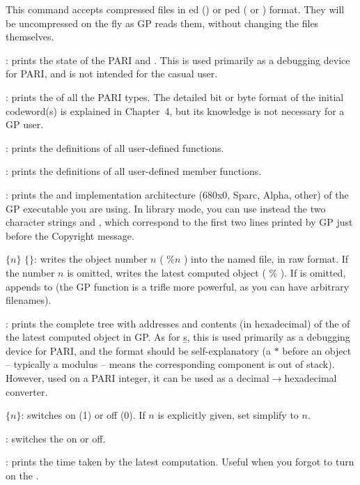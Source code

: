 \unix This command accepts compressed files in ed ()
or ped ( or ) format. They will be uncompressed on
the fly as GP reads them, without changing the files themselves.

: prints the state of the PARI  and .
This is used primarily as a debugging device for PARI, and is not intended
for the casual user.

: prints the  of all the PARI
types. The detailed bit or byte format of the initial codeword(s) is
explained in Chapter~4, but its knowledge is not necessary for a GP user.

: prints the definitions of all user-defined functions.

: prints the definitions of all user-defined member functions.

: prints the  and implementation architecture
(680x0, Sparc, Alpha, other) of the GP executable you are using. In library
mode, you can use instead the two character strings  and
, which correspond to the first two lines printed by GP just
before the Copyright message.

 $\{n\}$ $\{$$\}$: writes the object number
$n$ ( $\%n$ ) into the named file, in raw format. If the number $n$ is
omitted, writes the latest computed object ( $\%$ ). If  is
omitted, appends to  (the GP function  is a trifle more
powerful, as you can have arbitrary filenames).

: prints the complete tree with addresses and contents (in
hexadecimal) of the  of the latest computed
object in GP. As for \b{s}, this is used primarily as a debugging device for
PARI, and the format should be self-explanatory (a $*$ before an object --
typically a modulus -- means the corresponding component is out of stack).
However, used on a PARI integer, it can be used as a
decimal$\rightarrow$hexadecimal converter.

 $\{n\}$: switches  on (1) or off (0). If $n$
is explicitly given, set simplify to $n$.

\subseckbd{\#}: switches the  on or off.

\subseckbd{\#\#}: prints the time taken by the latest computation.
Useful when you forgot to turn on the .

